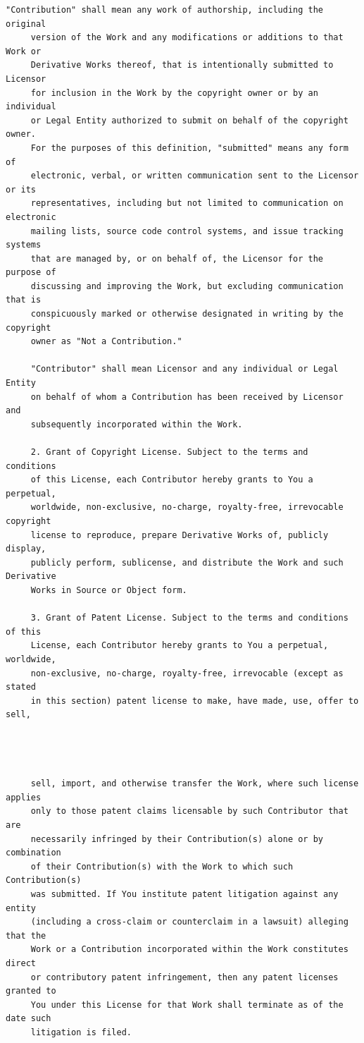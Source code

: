 \begin{lstlisting}[basicstyle=\ttfamily\footnotesize,breaklines=true]
     "Contribution" shall mean any work of authorship, including the original
     version of the Work and any modifications or additions to that Work or
     Derivative Works thereof, that is intentionally submitted to Licensor
     for inclusion in the Work by the copyright owner or by an individual
     or Legal Entity authorized to submit on behalf of the copyright owner.
     For the purposes of this definition, "submitted" means any form of
     electronic, verbal, or written communication sent to the Licensor or its
     representatives, including but not limited to communication on electronic
     mailing lists, source code control systems, and issue tracking systems
     that are managed by, or on behalf of, the Licensor for the purpose of
     discussing and improving the Work, but excluding communication that is
     conspicuously marked or otherwise designated in writing by the copyright
     owner as "Not a Contribution."

     "Contributor" shall mean Licensor and any individual or Legal Entity
     on behalf of whom a Contribution has been received by Licensor and
     subsequently incorporated within the Work.

     2. Grant of Copyright License. Subject to the terms and conditions
     of this License, each Contributor hereby grants to You a perpetual,
     worldwide, non-exclusive, no-charge, royalty-free, irrevocable copyright
     license to reproduce, prepare Derivative Works of, publicly display,
     publicly perform, sublicense, and distribute the Work and such Derivative
     Works in Source or Object form.

     3. Grant of Patent License. Subject to the terms and conditions of this
     License, each Contributor hereby grants to You a perpetual, worldwide,
     non-exclusive, no-charge, royalty-free, irrevocable (except as stated
     in this section) patent license to make, have made, use, offer to sell,




     sell, import, and otherwise transfer the Work, where such license applies
     only to those patent claims licensable by such Contributor that are
     necessarily infringed by their Contribution(s) alone or by combination
     of their Contribution(s) with the Work to which such Contribution(s)
     was submitted. If You institute patent litigation against any entity
     (including a cross-claim or counterclaim in a lawsuit) alleging that the
     Work or a Contribution incorporated within the Work constitutes direct
     or contributory patent infringement, then any patent licenses granted to
     You under this License for that Work shall terminate as of the date such
     litigation is filed.


\end{lstlisting}
